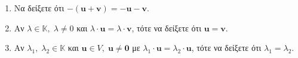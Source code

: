 \begin{exercises}
\item {}
    \begin{enumerate}
        \item Να δείξετε ότι $ - ( \mathbf{u}+ \mathbf{v} ) = - \mathbf{u} - 
            \mathbf{v} $.
        \item Αν $ \lambda \in \mathbb{K}, \; \lambda \neq 0 $ και 
            $ \lambda \cdot \mathbf{u}= \lambda \cdot \mathbf{v}$, τότε να 
            δείξετε ότι $ \mathbf{u} = \mathbf{v} $.
        \item Αν $ \lambda_{1}, \; \lambda _{2} \in \mathbb{K} $ και 
            $ \mathbf{u} \in V, \; \mathbf{u} \neq \mathbf{0} $ με 
            $ \lambda _{1}\cdot \mathbf{u} = \lambda _{2} \cdot \mathbf{u}$, 
            τότε να δείξετε ότι $ \lambda _{1} = \lambda _{2} $.
    \end{enumerate}
\end{exercises}
